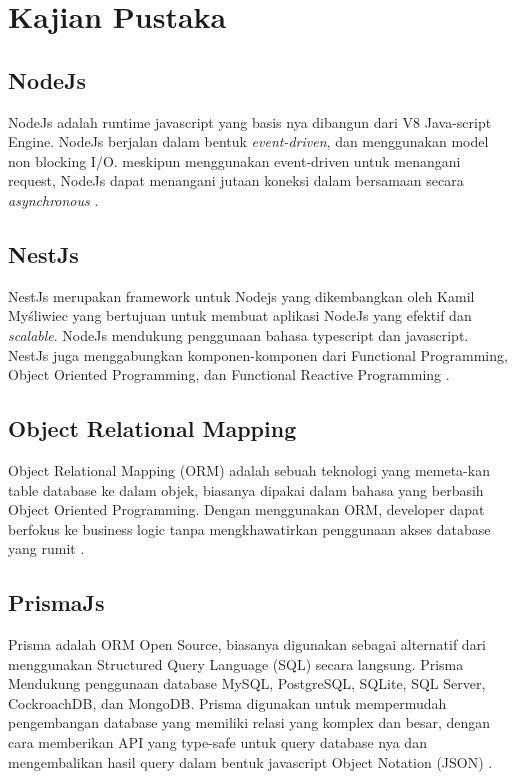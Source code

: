 \chapter{Kajian Pustaka}
 
\section{NodeJs}
NodeJs adalah runtime javascript yang basis nya dibangun dari V8 Java-script Engine. NodeJs berjalan dalam bentuk \textit{event-driven}, dan menggunakan model non blocking I/O. meskipun menggunakan event-driven untuk menangani request, NodeJs dapat menangani jutaan koneksi dalam bersamaan secara \textit{asynchronous} \cite{shah2017node}.

\section{NestJs}
NestJs merupakan framework untuk Nodejs yang dikembangkan oleh Kamil Myśliwiec yang bertujuan untuk membuat aplikasi NodeJs yang efektif dan \textit{scalable}. NodeJs mendukung penggunaan bahasa typescript dan javascript. NestJs juga menggabungkan komponen-komponen dari Functional Programming, Object Oriented Programming, dan Functional Reactive Programming \cite{pham2020developing} \cite{NestJS}.

\section{Object Relational Mapping}
Object Relational Mapping (ORM) adalah sebuah teknologi yang memeta-kan table database ke dalam objek, biasanya dipakai dalam bahasa yang berbasih Object Oriented Programming. Dengan menggunakan ORM, developer dapat berfokus ke business logic tanpa mengkhawatirkan penggunaan akses database yang rumit \cite{lorenz2017object}. 

\section{PrismaJs}
Prisma adalah ORM Open Source, biasanya digunakan sebagai alternatif dari menggunakan Structured Query Language (SQL) secara langsung. Prisma Mendukung penggunaan database MySQL, PostgreSQL, SQLite, SQL Server, CockroachDB, dan MongoDB. Prisma digunakan untuk mempermudah pengembangan database yang memiliki relasi yang komplex dan besar, dengan cara memberikan API yang type-safe untuk query database nya dan mengembalikan hasil query dalam bentuk javascript Object Notation (JSON) \cite{Prisma}.

